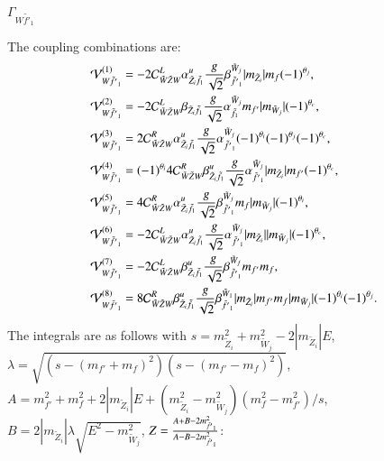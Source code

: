 \documentclass[final,3p,times]{elsarticle}
\begin{document}
\textbf{\underline{$\Gamma_{W \tilde{f'}_1}$}}

The coupling combinations are:
\begin{align}
\mathcal{V}_{W \tilde{f'}_1}^{(1)} &= -2 \mathcal{C}_{\tilde{W} \tilde{Z} W}^L \alpha_{\tilde{Z}_i \tilde{f}_1}^{u} {g \over \sqrt{2}} \beta_{\tilde{f'}_1}^{\tilde{W}_j}|m_{\tilde{Z}_i}|m_{f}(-1)^{\theta_j}, \\
\mathcal{V}_{W \tilde{f'}_1}^{(2)} &= -2 \mathcal{C}_{\tilde{W} \tilde{Z} W}^L \beta_{\tilde{Z}_i \tilde{f}_1} {g \over \sqrt{2}} \alpha_{\tilde{f}_1}^{\tilde{W}_j} m_{f'}|m_{\tilde{W}_j}|(-1)^{\theta_c}, \\
\mathcal{V}_{W \tilde{f'}_1}^{(3)} &= 2 \mathcal{C}_{\tilde{W} \tilde{Z} W}^R \alpha_{\tilde{Z}_i \tilde{f}_1}^{u} {g \over \sqrt{2}} \alpha_{\tilde{f'}_1}^{\tilde{W}_j}(-1)^{\theta_i}(-1)^{\theta_j}(-1)^{\theta_c}, \\
\mathcal{V}_{W \tilde{f'}_1}^{(4)} &= (-1)^{\theta_i}4 \mathcal{C}_{\tilde{W} \tilde{Z} W}^R \beta_{\tilde{Z}_i \tilde{f}_1}^{u} {g \over \sqrt{2}} \alpha_{\tilde{f'}_1}^{\tilde{W}_j}|m_{\tilde{Z}_i}|m_{f'}(-1)^{\theta_c}, \\
\mathcal{V}_{W \tilde{f'}_1}^{(5)} &= 4 \mathcal{C}_{\tilde{W} \tilde{Z} W}^R \alpha_{\tilde{Z}_i \tilde{f}_1}^{u} {g \over \sqrt{2}} \beta_{\tilde{f'}_1}^{\tilde{W}_j}m_{f}|m_{\tilde{W}_j}|(-1)^{\theta_i}, \\
\mathcal{V}_{W \tilde{f'}_1}^{(6)} &= -2 \mathcal{C}_{\tilde{W} \tilde{Z} W}^L \alpha_{\tilde{Z}_i \tilde{f}_1}^{u} {g \over \sqrt{2}} \alpha_{\tilde{f'}_1}^{\tilde{W}_j}|m_{\tilde{Z}_i}||m_{\tilde{W}_j}|(-1)^{\theta_c}, \\
\mathcal{V}_{W \tilde{f'}_1}^{(7)} &= -2 \mathcal{C}_{\tilde{W} \tilde{Z} W}^L \beta_{\tilde{Z}_i \tilde{f}_1}^{u} {g \over \sqrt{2}} \beta_{\tilde{f'}_1}^{\tilde{W}_f} m_{f'}m_{f}, \\ 
\mathcal{V}_{W \tilde{f'}_1}^{(8)} &= 8 \mathcal{C}_{\tilde{W} \tilde{Z} W}^R \beta_{\tilde{Z}_i \tilde{f}_1}^{u} {g \over \sqrt{2}} \beta_{\tilde{f'}_1}^{\tilde{W}_1} |m_{\tilde{Z}_i}|m_{f'} m_{f}|m_{\tilde{W}_j}|(-1)^{\theta_i}(-1)^{\theta_j}. \\
\end{align}
The integrals are as follows with $s = m_{\tilde{Z}_i}^2 + m_{\tilde{W}_j}^2 - 2|m_{\tilde{Z}_i}|E$, $\lambda = \sqrt{(s-(m_{f'}+m_{f})^2)(s-(m_{f'}-m_{f})^2)}$, $A = m_{f'}^2 + m_{f}^2 + 2|m_{\tilde{Z}_i}|E + (m_{\tilde{Z}_i}^2 - m_{\tilde{W}_j}^2)(m_{f}^2 - m_{f'}^2)/s$, $B = 2|m_{\tilde{Z}_i}| \lambda \sqrt{E^2-m_{\tilde{W}_j}^2} $, $Z = {A + B - 2m_{\tilde{f'}_1}^2 \over A - B - 2m_{\tilde{f'}_1}^2}$:
\end{document}
